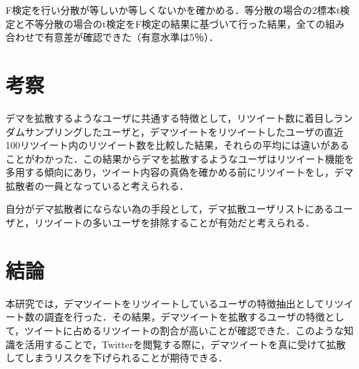 \documentclass[uplatex,twocolumn,dvipdfmx]{jsarticle}
\begin{document}
F検定を行い分散が等しいか等しくないかを確かめる．等分散の場合の2標本t検定と不等分散の場合のt検定をF検定の結果に基づいて行った結果，全ての組み合わせで有意差が確認できた（有意水準は5％）．

\section{考察}
デマを拡散するようなユーザに共通する特徴として，リツイート数に着目しランダムサンプリングしたユーザと，デマツイートをリツイートしたユーザの直近100リツイート内のリツイート数を比較した結果，それらの平均には違いがあることがわかった．この結果からデマを拡散するようなユーザはリツイート機能を多用する傾向にあり，ツイート内容の真偽を確かめる前にリツイートをし，デマ拡散者の一員となっていると考えられる．

自分がデマ拡散者にならない為の手段として，デマ拡散ユーザリストにあるユーザと，リツイートの多いユーザを排除することが有効だと考えられる．

\section{結論}
本研究では，デマツイートをリツイートしているユーザの特徴抽出としてリツイート数の調査を行った．その結果，デマツイートを拡散するユーザの特徴として，ツイートに占めるリツイートの割合が高いことが確認できた．このような知識を活用することで，Twitterを閲覧する際に，デマツイートを真に受けて拡散してしまうリスクを下げられることが期待できる．


\end{document}
